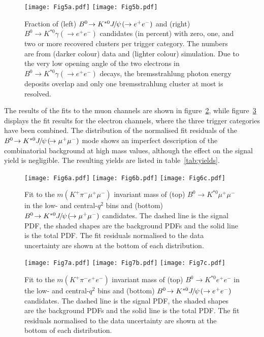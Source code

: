 \documentclass[12pt,a4paper]{article}
\def\Pmu         {\ensuremath{\upmu}\xspace}
\def\Ppi         {\ensuremath{\uppi}\xspace}
\def\Ppsi        {\ensuremath{\uppsi}\xspace}
\def\PB      {\ensuremath{\mathrm{B}}\xspace}
\def\PJ      {\ensuremath{\mathrm{J}}\xspace}
\def\PK      {\ensuremath{\mathrm{K}}\xspace}
\def\Pe      {\ensuremath{\mathrm{e}}\xspace}
\def\Pmu         {\ensuremath{\mu}\xspace}
\def\Ppi         {\ensuremath{\pi}\xspace}
\def\Ppsi        {\ensuremath{\psi}\xspace}
\def\PB      {\ensuremath{B}\xspace}
\def\PJ      {\ensuremath{J}\xspace}
\def\PK      {\ensuremath{K}\xspace}
\def\Pe      {\ensuremath{e}\xspace}
\def\en         {\ensuremath{\Pe^-}\xspace}   \def\ep         {\ensuremath{\Pe^+}\xspace}
\def\epem       {\ensuremath{\Pe^+\Pe^-}\xspace}
\def\mup        {\ensuremath{\Pmu^+}\xspace}
\def\mun        {\ensuremath{\Pmu^-}\xspace} \def\mumu       {\ensuremath{\Pmu^+\Pmu^-}\xspace}
\def\pion  {\ensuremath{\Ppi}\xspace}
\def\pim   {\ensuremath{\pion^-}\xspace}
\def\kaon  {\ensuremath{\PK}\xspace}
\def\Kp    {\ensuremath{\kaon^+}\xspace}
\def\Kstarz  {\ensuremath{\kaon^{*0}}\xspace}
\def\B       {\ensuremath{\PB}\xspace}
\def\Bd      {\ensuremath{\B^0}\xspace}
\def\jpsi     {\ensuremath{{\PJ\mskip -3mu/\mskip -2mu\Ppsi\mskip 2mu}}\xspace}
\newcommand{\decay}[2]{\ensuremath{#1\!\to #2}\xspace}         \def\ra                 {\ensuremath{\rightarrow}\xspace}
\def\to                 {\ensuremath{\rightarrow}\xspace}
\def\qsq       {\ensuremath{q^2}\xspace}
\def\BdToKstmm    {\decay{\Bd}{\Kstarz\mup\mun}}
\def\cqsq{central-\qsq}
\def\mKpimm{\ensuremath{m(\KPi \mumu)}\xspace}
\def\mKpiee{\ensuremath{m(\KPi \ee)}\xspace}
\def\KPi{\ensuremath{\Kp\pim}\xspace}
\def\ee{\ensuremath{\ep\en}\xspace}
\def\BdToKstmm{\mbox{\decay{\Bd}{\Kstarz \mumu}}\xspace}
\def\BdToKstee{\mbox{\decay{\Bd}{\Kstarz \epem}}\xspace}
\def\BdToKstGee{\mbox{\decay{\Bd}{\Kstarz \gamma(\to\epem)}}\xspace}
\def\BdToKstJPsmm{\mbox{\decay{\Bd}{\Kstarz \jpsi(\decay{}{\mumu})}}\xspace}
\def\BdToKstJPsee{\mbox{\decay{\Bd}{\Kstarz \jpsi(\to\epem)}}\xspace}
\begin{document}
\begin{figure}[t!]
\centering
\texttt{[image: Fig5a.pdf]}
\texttt{[image: Fig5b.pdf]}
\caption{Fraction of (left) \BdToKstJPsee and (right) \BdToKstGee candidates (in percent) with zero, one, and two or more recovered clusters per trigger category. The numbers are from (darker colour) data and (lighter colour) simulation. Due to the very low opening angle of the two electrons in \BdToKstGee decays, 
the bremsstrahlung photon energy deposits overlap and only one bremsstrahlung cluster at most is resolved.}
\label{fig:brem}
\end{figure}

The results of the fits to the muon channels are shown in figure~\ref{fig:fitMM}, while figure~\ref{fig:fitEE} displays the fit results for the electron channels, where the three trigger categories have been combined.
The distribution of the normalised fit residuals of the \BdToKstJPsmm mode shows an imperfect description of the combinatorial background at high mass values, although the effect on the signal yield is negligible.
The resulting yields are listed in table~\ref{tab:yields}. 

\begin{figure}[t!]
\centering
\texttt{[image: Fig6a.pdf]}
\texttt{[image: Fig6b.pdf]}
\texttt{[image: Fig6c.pdf]}
\caption{Fit to the \mKpimm invariant mass of (top) \BdToKstmm in the low- and \cqsq bins and (bottom) \BdToKstJPsmm candidates. The dashed line is the signal PDF, the shaded shapes are the background PDFs and the solid line is the total PDF. The fit residuals normalised to the data uncertainty are shown at the bottom of each distribution.}
\label{fig:fitMM}
\end{figure}

\begin{figure}[t!]
\centering
\texttt{[image: Fig7a.pdf]}
\texttt{[image: Fig7b.pdf]}
\texttt{[image: Fig7c.pdf]}
\caption{Fit to the \mKpiee invariant mass of (top) \BdToKstee in the low- and \cqsq bins and (bottom) \BdToKstJPsee candidates. The dashed line is the signal PDF, the shaded shapes are the background PDFs and the solid line is the total PDF. The fit residuals normalised to the data uncertainty are shown at the bottom of each distribution.}
\label{fig:fitEE}
\end{figure}
\end{document}
